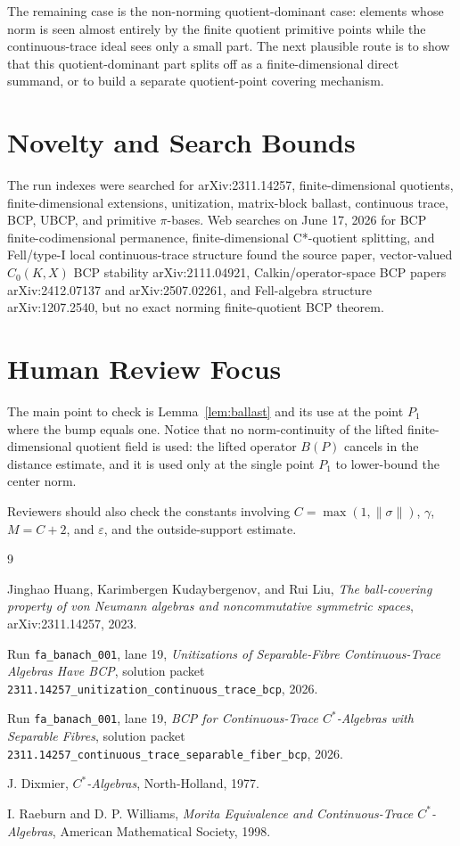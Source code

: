 \documentclass[11pt]{article}
\begin{document}
The remaining case is the non-norming quotient-dominant case: elements whose
norm is seen almost entirely by the finite quotient primitive points while the
continuous-trace ideal sees only a small part.  The next plausible route is to
show that this quotient-dominant part splits off as a finite-dimensional
direct summand, or to build a separate quotient-point covering mechanism.

\section*{Novelty and Search Bounds}

The run indexes were searched for arXiv:2311.14257, finite-dimensional
quotients, finite-dimensional extensions, unitization, matrix-block ballast,
continuous trace, BCP, UBCP, and primitive \(\pi\)-bases.  Web searches on
June 17, 2026 for BCP finite-codimensional permanence, finite-dimensional
C*-quotient splitting, and Fell/type-I local continuous-trace structure found
the source paper, vector-valued \(C_0(K,X)\) BCP stability
arXiv:2111.04921, Calkin/operator-space BCP papers arXiv:2412.07137 and
arXiv:2507.02261, and Fell-algebra structure arXiv:1207.2540, but no exact
norming finite-quotient BCP theorem.

\section*{Human Review Focus}

The main point to check is Lemma~\ref{lem:ballast} and its use at the point
\(P_1\) where the bump equals one.  Notice that no norm-continuity of the
lifted finite-dimensional quotient field is used: the lifted operator
\(B(P)\) cancels in the distance estimate, and it is used only at the single
point \(P_1\) to lower-bound the center norm.

Reviewers should also check the constants involving \(C=\max(1,\|\sigma\|)\),
\(\gamma\), \(M=C+2\), and \(\varepsilon\), and the outside-support estimate.

\begin{thebibliography}{9}

Jinghao Huang, Karimbergen Kudaybergenov, and Rui Liu,
\emph{The ball-covering property of von Neumann algebras and noncommutative
symmetric spaces},
arXiv:2311.14257, 2023.

Run \texttt{fa\_banach\_001}, lane 19,
\emph{Unitizations of Separable-Fibre Continuous-Trace Algebras Have BCP},
solution packet
\texttt{2311.14257\_unitization\_continuous\_trace\_bcp}, 2026.

Run \texttt{fa\_banach\_001}, lane 19,
\emph{BCP for Continuous-Trace \(C^*\)-Algebras with Separable Fibres},
solution packet
\texttt{2311.14257\_continuous\_trace\_separable\_fiber\_bcp}, 2026.

J. Dixmier,
\emph{\(C^*\)-Algebras},
North-Holland, 1977.

I. Raeburn and D. P. Williams,
\emph{Morita Equivalence and Continuous-Trace \(C^*\)-Algebras},
American Mathematical Society, 1998.

\end{thebibliography}
\end{document}
